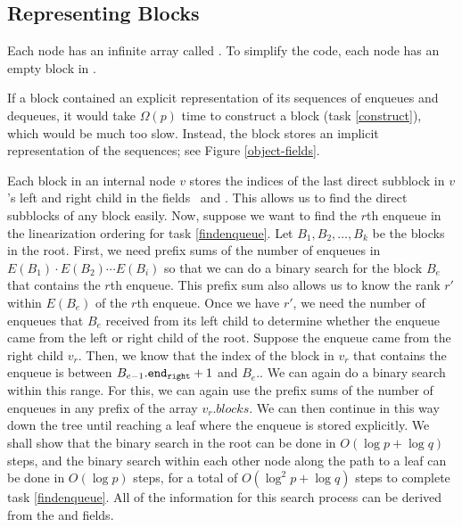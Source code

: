 \subsection{Representing Blocks}

Each node has an infinite array called .
To simplify the code, each node has an empty block in .

If a block contained an explicit representation of its sequences of enqueues and dequeues,
it would take $\Omega(p)$ time to construct a block (task \ref{construct}), which would be much too slow.
Instead, the block stores an implicit representation of the sequences; see Figure \ref{object-fields}.

Each block in an internal node $v$ stores the indices of the last direct subblock in $v$'s left and right child in the fields \eleft\ and \eright.  This allows us to find the direct subblocks of any block easily.
Now, suppose we want to find the $r$th enqueue in the linearization ordering for task \ref{findenqueue}.
Let $B_1, B_2, \ldots, B_k$ be the blocks in the root.
First, we need prefix sums of the number of enqueues in $E(B_1)\cdot E(B_2)\cdots E(B_i)$
so that we can do a binary search for the block $B_e$ that contains the $r$th enqueue.
This prefix sum also allows us to know the rank $r'$ within $E(B_e)$ of the $r$th enqueue.
Once we have $r'$, we need the number of enqueues that $B_e$ received from its left child
to determine whether the enqueue came from the left or right child of the root.
Suppose the enqueue came from the right child $v_r$.
Then, we know that the index of the block in $v_r$ that contains the enqueue
is between $B_{e-1}.{\normalfont{\texttt{end\textsubscript{right}}}} + 1$ and $B_e$.\eright.
We can again do a binary search within this range.
For this, we can again use the prefix sums of the number of enqueues in any prefix of the array $v_r.blocks$.
We can then continue in this way down the tree until reaching a leaf where the enqueue is stored explicitly.
We shall show that the binary search in the root can be done in $O(\log p + \log q)$ steps,
and the binary search within each other node along the path to a leaf can be done in $O(\log p)$ steps,
for a total of $O(\log^2 p + \log q)$ steps to complete task \ref{findenqueue}.
All of the information for this search process can be derived from the 
 and  fields.

